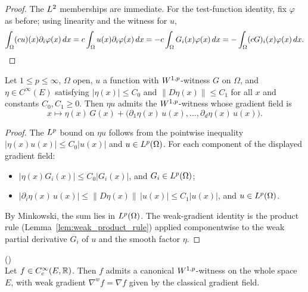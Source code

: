 \begin{proof}
\leanok

The $L^{2}$ memberships are immediate. For the test-function identity, fix
$\varphi$ as before; using linearity and the witness for $u$,
\begin{equation*}
  \int_\Omega (cu)(x)\partial_i\varphi(x)\,dx
    = c\int_\Omega u(x)\partial_i\varphi(x)\,dx
    = -c\int_\Omega G_i(x)\varphi(x)\,dx
    = -\int_\Omega (cG)_i(x)\varphi(x)\,dx. \qedhere
\end{equation*}
\end{proof}

\begin{proposition}
\label{prop:witness_mul_smooth_bounded}
\leanok
{}
Let $1 \le p \le \infty$, $\Omega$ open, $u$ a function with $W^{1,p}$-witness
$G$ on $\Omega$, and $\eta \in C^\infty(E)$ satisfying
$|\eta(x)| \le C_0$ and $\|D\eta(x)\| \le C_1$ for all $x$ and constants
$C_0, C_1 \ge 0$. Then $\eta u$ admits the $W^{1,p}$-witness whose gradient
field is
\begin{equation*}
  x \mapsto \eta(x)\,G(x) + \bigl(\partial_1\eta(x)\,u(x),\ldots,\partial_d\eta(x)\,u(x)\bigr).
\end{equation*}
\end{proposition}

\begin{proof}
\leanok
{}

The $L^{p}$ bound on $\eta u$ follows from the pointwise inequality
$|\eta(x)u(x)| \le C_0 |u(x)|$ and $u \in L^{p}(\Omega)$. For each component
of the displayed gradient field:
\begin{itemize}
  \item $|\eta(x)G_i(x)| \le C_0 |G_i(x)|$, and $G_i \in L^{p}(\Omega)$;
  \item $|\partial_i\eta(x)\,u(x)| \le \|D\eta(x)\|\,|u(x)| \le C_1 |u(x)|$,
        and $u \in L^{p}(\Omega)$.
\end{itemize}
By Minkowski, the sum lies in $L^{p}(\Omega)$. The weak-gradient identity is
the product rule (Lemma~\ref{lem:weak_product_rule}) applied componentwise to
the weak partial derivative $G_i$ of $u$ and the smooth factor $\eta$.
\end{proof}

\begin{lemma}
\label{lem:witness_smooth_cpt}
\leanok
{}
()\\
Let $f \in C^\infty_c(E,\mathbb{R})$. Then $f$ admits a canonical $W^{1,p}$-witness
on the whole space $E$, with weak gradient $\nabla^w f = \nabla f$ given by the
classical gradient field.
\end{lemma}

